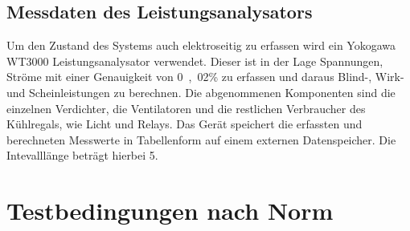 \subsection{Messdaten des Leistungsanalysators}
\label{subsec:Messdaten des Leistungsanalysators}

Um den Zustand des Systems auch elektroseitig zu erfassen wird ein Yokogawa WT3000 Leistungsanalysator verwendet. Dieser ist in der Lage Spannungen, Ströme mit einer Genauigkeit von \unit{0,02}{\%} zu erfassen und daraus Blind-, Wirk- und Scheinleistungen zu berechnen. Die abgenommenen Komponenten sind die einzelnen Verdichter, die Ventilatoren und die restlichen Verbraucher des Kühlregals, wie Licht und Relays.
Das Gerät speichert die erfassten und berechneten Messwerte in Tabellenform auf einem externen Datenspeicher. Die Intevalllänge beträgt hierbei \unit{5}{\second}.


\section{Testbedingungen nach Norm}
\label{sec:Testbedingungen nach Norm}




 \cite{DINDeutschesInstitutfurNormunge.V..}


